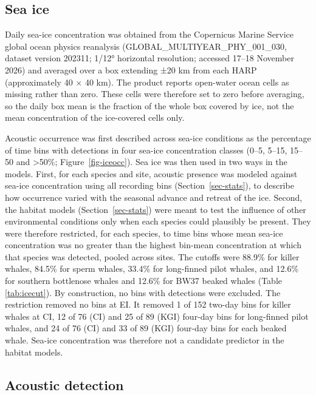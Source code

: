 \documentclass[
  11pt,
]{article}
\begin{document}
\subsection{Sea ice}\label{sec-ice}

Daily sea-ice concentration was obtained from the Copernicus Marine
Service global ocean physics reanalysis
(GLOBAL\_MULTIYEAR\_PHY\_001\_030, dataset version 202311; 1/12°
horizontal resolution; accessed 17--18 November 2026) and averaged over
a box extending ±20 km from each HARP (approximately 40 × 40 km). The
product reports open-water ocean cells as missing rather than zero.
These cells were therefore set to zero before averaging, so the daily
box mean is the fraction of the whole box covered by ice, not the mean
concentration of the ice-covered cells only.

Acoustic occurrence was first described across sea-ice conditions as the
percentage of time bins with detections in four sea-ice concentration
classes (0--5, 5--15, 15--50 and \textgreater50\%;
Figure~\ref{fig-iceocc}). Sea ice was then used in two ways in the
models. First, for each species and site, acoustic presence was modeled
against sea-ice concentration using all recording bins
(Section~\ref{sec-stats}), to describe how occurrence varied with the
seasonal advance and retreat of the ice. Second, the habitat models
(Section~\ref{sec-stats}) were meant to test the influence of other
environmental conditions only when each species could plausibly be
present. They were therefore restricted, for each species, to time bins
whose mean sea-ice concentration was no greater than the highest
bin-mean concentration at which that species was detected, pooled across
sites. The cutoffs were 88.9\% for killer whales, 84.5\% for sperm
whales, 33.4\% for long-finned pilot whales, and 12.6\% for southern
bottlenose whales and 12.6\% for BW37 beaked whales (Table
\ref{tab:icecut}). By construction, no bins with detections were
excluded. The restriction removed no bins at EI. It removed 1 of 152
two-day bins for killer whales at CI, 12 of 76 (CI) and 25 of 89 (KGI)
four-day bins for long-finned pilot whales, and 24 of 76 (CI) and 33 of
89 (KGI) four-day bins for each beaked whale. Sea-ice concentration was
therefore not a candidate predictor in the habitat models.

\subsection{Acoustic detection}\label{sec-detect}
\end{document}
